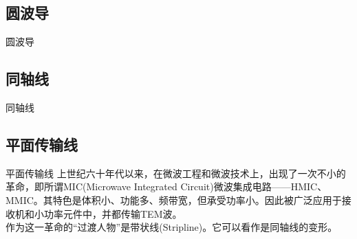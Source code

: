 \subsection{圆波导}
\begin{frame}{圆波导}

\end{frame}

\subsection{同轴线}
\begin{frame}{同轴线}

\end{frame}

\subsection{平面传输线}
\begin{frame}{平面传输线}
    上世纪六十年代以来，在微波工程和微波技术上，出现了一次不小的革命，即所谓MIC(Microwave Integrated Circuit)微波集成电路——HMIC、MMIC。其特色是体积小、功能多、频带宽，但承受功率小。因此被广泛应用于接收机和小功率元件中，并都传输TEM波。\\
    作为这一革命的“过渡人物”是带状线(Stripline)。它可以看作是同轴线的变形。
\end{frame}






